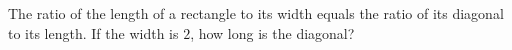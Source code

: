 The ratio of the length of a rectangle to its width equals the ratio of its diagonal to its length. If the width is $2$, how long is the diagonal?
